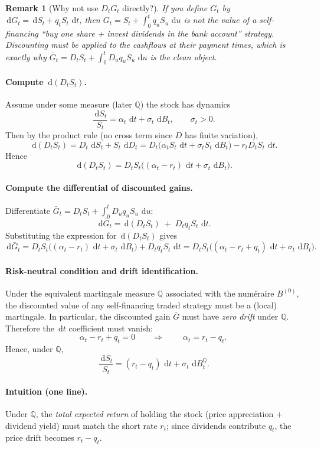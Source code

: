 \documentclass[11pt]{article}
\newcommand{\Qbb}{\mathbb{Q}}
\newcommand{\dd}{\,\mathrm{d}}
\newcommand{\1}{\mathbf{1}}
\newtheorem{remark}{Remark}
\begin{document}
\begin{remark}[Why not use $D_tG_t$ directly?]
If you define $G_t$ by $\dd G_t=\dd S_t+q_tS_t\,\dd t$, then $G_t=S_t+\int_0^t q_uS_u\,\dd u$ is \emph{not}
the value of a self-financing ``buy one share + invest dividends in the bank account'' strategy.
Discounting must be applied to the \emph{cashflows at their payment times}, which is exactly why
$\bar G_t = D_tS_t+\int_0^t D_u q_u S_u\,\dd u$ is the clean object.
\end{remark}

\paragraph{Compute $\dd(D_tS_t)$.}
Assume under some measure (later $\Qbb$) the stock has dynamics
\[
\frac{\dd S_t}{S_t} = \alpha_t\,\dd t + \sigma_t\,\dd B_t,
\qquad \sigma_t>0.
\]
Then by the product rule (no cross term since $D$ has finite variation),
\[
\dd(D_tS_t)=D_t\,\dd S_t + S_t\,\dd D_t
= D_t\big(\alpha_t S_t\,\dd t+\sigma_t S_t\,\dd B_t\big) - r_t D_t S_t\,\dd t.
\]
Hence
\[
\boxed{\;
\dd(D_tS_t)
=
D_tS_t\big((\alpha_t-r_t)\,\dd t + \sigma_t\,\dd B_t\big).
\;}
\]

\paragraph{Compute the differential of discounted gains.}
Differentiate $\bar G_t = D_tS_t + \int_0^t D_u q_u S_u\,\dd u$:
\[
\dd \bar G_t
=
\dd(D_tS_t) \;+\; D_t q_t S_t\,\dd t.
\]
Substituting the expression for $\dd(D_tS_t)$ gives
\[
\dd \bar G_t
=
D_tS_t\big((\alpha_t-r_t)\,\dd t + \sigma_t\,\dd B_t\big) + D_t q_t S_t\,\dd t
=
D_tS_t\big((\alpha_t-r_t+q_t)\,\dd t + \sigma_t\,\dd B_t\big).
\]

\paragraph{Risk-neutral condition and drift identification.}
Under the equivalent martingale measure $\Qbb$ associated with the num\'eraire $B^{(0)}$,
the discounted value of any self-financing traded strategy must be a (local) martingale.
In particular, the discounted gain $\bar G$ must have \emph{zero drift} under $\Qbb$.
Therefore the $\dd t$ coefficient must vanish:
\[
\alpha_t-r_t+q_t=0
\qquad\Longrightarrow\qquad
\boxed{\ \alpha_t = r_t-q_t.\ }
\]
Hence, under $\Qbb$,
\[
\boxed{\ \frac{\dd S_t}{S_t}=(r_t-q_t)\,\dd t+\sigma_t\,\dd B_t^{\Qbb}. \ }
\]

\paragraph{Intuition (one line).}
Under $\Qbb$, the \emph{total expected return} of holding the stock (price appreciation $+$ dividend yield)
must match the short rate $r_t$; since dividends contribute $q_t$, the price drift becomes $r_t-q_t$.
\end{document}
